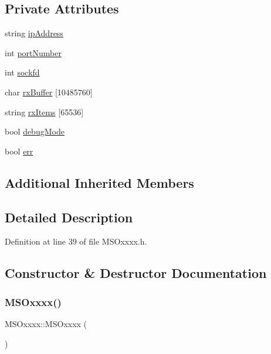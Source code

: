 \subsection*{Private Attributes}
\begin{DoxyCompactItemize}
\item 
string \hyperlink{classMSOxxxx_aa55bdb0feb799b195628fe6ef0222b62}{ip\+Address}
\item 
int \hyperlink{classMSOxxxx_a242bcf72c701cd20d86d25315fc6180f}{port\+Number}
\item 
int \hyperlink{classMSOxxxx_acf030a8f1ddd78d632816c856f50455c}{sockfd}
\item 
char \hyperlink{classMSOxxxx_a1a50770759caada18087ca8ffb96f357}{rx\+Buffer} \mbox{[}10485760\mbox{]}
\item 
string \hyperlink{classMSOxxxx_a847cae37181e9ec5f481edcc3fb19b1a}{rx\+Items} \mbox{[}65536\mbox{]}
\item 
bool \hyperlink{classMSOxxxx_a826ba82e93bbe5780169107a31dbfd29}{debug\+Mode}
\item 
bool \hyperlink{classMSOxxxx_af0af7ac8123ee93917d0e92ec947acaa}{err}
\end{DoxyCompactItemize}
\subsection*{Additional Inherited Members}


\subsection{Detailed Description}


Definition at line 39 of file M\+S\+Oxxxx.\+h.



\subsection{Constructor \& Destructor Documentation}
\mbox{\label{classMSOxxxx_afa2d5e8dcabe88d8c4ef54238a4e7bc7}} 
\subsubsection{\texorpdfstring{M\+S\+Oxxxx()}{MSOxxxx()}}
{\footnotesize\ttfamily M\+S\+Oxxxx\+::\+M\+S\+Oxxxx (\begin{DoxyParamCaption}{ }\end{DoxyParamCaption})}



